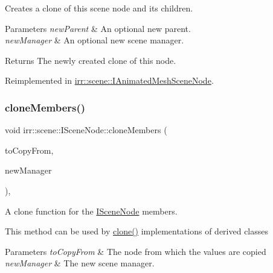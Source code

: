 Creates a clone of this scene node and its children. 


\begin{DoxyParams}{Parameters}
{\em new\+Parent} & An optional new parent. \\
\hline
{\em new\+Manager} & An optional new scene manager. \\
\hline
\end{DoxyParams}
\begin{DoxyReturn}{Returns}
The newly created clone of this node. 
\end{DoxyReturn}


Reimplemented in \hyperlink{classirr_1_1scene_1_1IAnimatedMeshSceneNode_a47aabf6554e3f91bbb033edb8668cec8}{irr\+::scene\+::\+I\+Animated\+Mesh\+Scene\+Node}.

\mbox{\label{classirr_1_1scene_1_1ISceneNode_a00a4ef0212b5d4b005202519859689bd}} 
\subsubsection{\texorpdfstring{clone\+Members()}{cloneMembers()}}
{\footnotesize\ttfamily void irr\+::scene\+::\+I\+Scene\+Node\+::clone\+Members (\begin{DoxyParamCaption}\item[{\hyperlink{classirr_1_1scene_1_1ISceneNode}{I\+Scene\+Node} $\ast$}]{to\+Copy\+From,  }\item[{\hyperlink{classirr_1_1scene_1_1ISceneManager}{I\+Scene\+Manager} $\ast$}]{new\+Manager }\end{DoxyParamCaption})\hspace{0.3cm}{\ttfamily [inline]}, {\ttfamily [protected]}}



A clone function for the \hyperlink{classirr_1_1scene_1_1ISceneNode}{I\+Scene\+Node} members. 

This method can be used by \hyperlink{classirr_1_1scene_1_1ISceneNode_ac39832b55855dc59196053adbaec95cc}{clone()} implementations of derived classes 
\begin{DoxyParams}{Parameters}
{\em to\+Copy\+From} & The node from which the values are copied \\
\hline
{\em new\+Manager} & The new scene manager. \\
\hline
\end{DoxyParams}
\mbox{\label{classirr_1_1scene_1_1ISceneNode_a5fb609b08fc89a92f928c19ce3b181eb}} 
